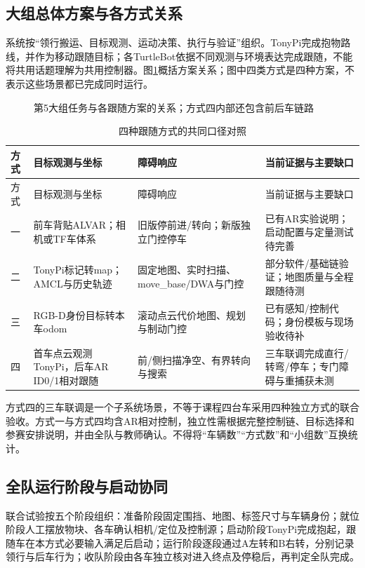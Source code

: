 \subsection{大组总体方案与各方式关系}
系统按“领行搬运、目标观测、运动决策、执行与验证”组织。TonyPi完成抱物路线，并作为移动跟随目标；各TurtleBot依据不同观测与环境表达完成跟随，不能将共用话题理解为共用控制器。图\ref{fig:collective-system}概括方案关系；图中四类方式是四种方案，不表示这些场景都已完成同时运行。
\begin{figure}[H]\centering

\caption{第5大组任务与各跟随方案的关系；方式四内部还包含前后车链路}\label{fig:collective-system}
\end{figure}
\begin{longtable}{p{19mm}p{38mm}p{37mm}p{43mm}}
\caption{四种跟随方式的共同口径对照}\\\toprule
方式 & 目标观测与坐标 & 障碍响应 & 当前证据与主要缺口\\\midrule\endfirsthead
\toprule 方式 & 目标观测与坐标 & 障碍响应 & 当前证据与主要缺口\\\midrule\endhead
一 & 前车背贴ALVAR；相机或TF车体系 & 旧版停前进/转向；新版独立门控停车 & 已有AR实验说明；启动配置与定量测试待完善\\
二 & TonyPi标记转map；AMCL与历史轨迹 & 固定地图、实时扫描、move\_base/DWA与门控 & 部分软件/基础链验证；地图质量与全程跟随待测\\
三 & RGB-D身份目标转本车odom & 滚动点云代价地图、规划与制动门控 & 已有感知/控制代码；身份模板与现场验收待补\\
四 & 首车点云观测TonyPi，后车AR ID0/1相对跟随 & 前/侧扫描净空、有界转向与搜索 & 三车联调完成直行/转弯/停车；专门障碍与重捕获未测\\\bottomrule
\end{longtable}
方式四的三车联调是一个子系统场景，不等于课程四台车采用四种独立方式的联合验收。方式一与方式四均含AR相对控制，独立性需根据完整控制链、目标选择和参赛安排说明，并由全队与教师确认。不得将“车辆数”“方式数”和“小组数”互换统计。

\subsection{全队运行阶段与启动协同}
联合试验按五个阶段组织：准备阶段固定围挡、地图、标签尺寸与车辆身份；就位阶段人工摆放物块、各车确认相机/定位及控制源；启动阶段TonyPi完成抱起，跟随车在本方式必要输入满足后启动；运行阶段逐段通过A左转和B右转，分别记录领行与后车行为；收队阶段由各车独立核对进入终点及停稳后，再判定全队完成。

